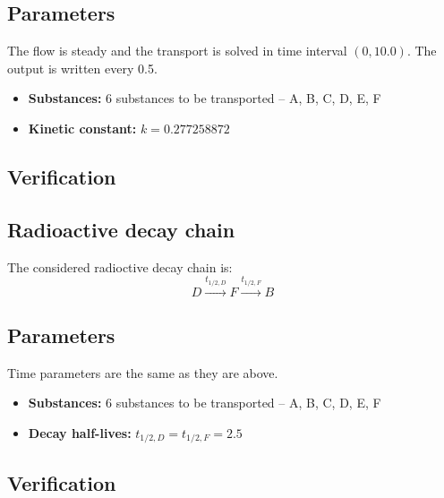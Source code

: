 \subsection*{Parameters}
The flow is steady and the transport is solved in time interval $(0,10.0)$. The output is written every 0.5.  
\begin{itemize}
  \item \textbf{Substances:} 6 substances to be transported -- A, B, C, D, E, F
  \item \textbf{Kinetic constant:} $k = 0.277258872$
\end{itemize}

\subsection*{Verification}

\subsection{Radioactive decay chain}
The considered radioctive decay chain is:
\[
 D\xrightarrow{t_{1/2,D}}F\xrightarrow{t_{1/2,F}}B
\]
\subsection*{Parameters}
Time parameters are the same as they are above.
\begin{itemize}
  \item \textbf{Substances:} 6 substances to be transported -- A, B, C, D, E, F
  \item \textbf{Decay half-lives:} $t_{1/2,D} = t_{1/2,F} = 2.5$
\end{itemize}

\subsection*{Verification}


